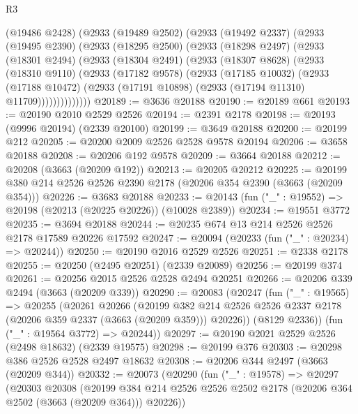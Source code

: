 \begin{lexlean}{R3}
\begin{coremodule}
    (@19486 @2428)
    (@2933
      (@19489 @2502)
      (@2933
        (@19492 @2337)
        (@2933
          (@19495 @2390)
          (@2933
            (@18295 @2500)
            (@2933
              (@18298 @2497)
              (@2933
                (@18301 @2494)
                (@2933
                  (@18304 @2491)
                  (@2933
                    (@18307 @8628)
                    (@2933
                      (@18310 @9110)
                      (@2933
                        (@17182 @9578)
                        (@2933
                          (@17185 @10032)
                          (@2933
                            (@17188 @10472)
                            (@2933 (@17191 @10898) (@2933 (@17194 @11310) @11709))))))))))))))
@20189 := @3636 @20188
@20190 := @20189 @661
@20193 := @20190 @2010 @2529 @2526
@20194 := @2391 @2178
@20198 := @20193 (@9996 @20194) (@2339 @20100)
@20199 := @3649 @20188
@20200 := @20199 @212
@20205 := @20200 @2009 @2526 @2528 @9578 @20194
@20206 := @3658 @20188
@20208 := @20206 @192 @9578
@20209 := @3664 @20188
@20212 := @20208 (@3663 (@20209 @192))
@20213 := @20205 @20212
@20225 := @20199 @380 @214 @2526 @2526 @2390 @2178 (@20206 @354 @2390 (@3663 (@20209 @354)))
@20226 := @3683 @20188
@20233 := @20143 (fun ("_" : @19552) => @20198 (@20213 (@20225 @20226)) (@10028 @2389))
@20234 := @19551 @3772
@20235 := @3694 @20188
@20244 := @20235 @674 @13 @214 @2526 @2526 @2178 @17589 @20226 @17592
@20247 := @20094 (@20233 (fun ("_" : @20234) => @20244))
@20250 := @20190 @2016 @2529 @2526
@20251 := @2338 @2178
@20255 := @20250 (@2495 @20251) (@2339 @20089)
@20256 := @20199 @374
@20261 := @20256 @2015 @2526 @2528 @2494 @20251
@20266 := @20206 @339 @2494 (@3663 (@20209 @339))
@20290 := @20083
    (@20247
      (fun ("_" : @19565) =>
      @20255
        (@20261
          @20266
          (@20199
            @382
            @214
            @2526
            @2526
            @2337
            @2178
            (@20206 @359 @2337 (@3663 (@20209 @359)))
            @20226))
        (@8129 @2336))
      (fun ("_" : @19564 @3772) => @20244))
@20297 := @20190 @2021 @2529 @2526 (@2498 @18632) (@2339 @19575)
@20298 := @20199 @376
@20303 := @20298 @386 @2526 @2528 @2497 @18632
@20308 := @20206 @344 @2497 (@3663 (@20209 @344))
@20332 := @20073
    (@20290
      (fun ("_" : @19578) =>
      @20297
        (@20303
          @20308
          (@20199
            @384
            @214
            @2526
            @2526
            @2502
            @2178
            (@20206 @364 @2502 (@3663 (@20209 @364)))
            @20226))

\end{coremodule}
\end{lexlean}
